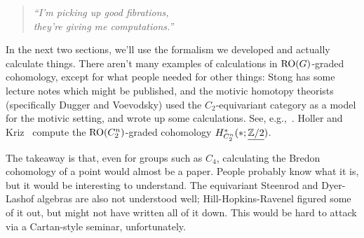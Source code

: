 \begin{quote}\textit{
	``I'm picking up good fibrations,\\
	they're giving me computations.''
}\end{quote}
\label{const_comp}

In the next two sections, we'll use the formalism we developed and actually calculate things. There aren't many
examples of calculations in $\mathrm{RO}(G)$-graded cohomology, except for what people needed for other things: Stong has
some lecture notes which might be published, and the motivic homotopy theorists (specifically Dugger and Voevodsky)
used the $C_2$-equivariant category as a model for the motivic setting, and wrote up some calculations. See,
e.g.,~\cite{Lew88, Dug15}. Holler and Kriz~\cite{HollerKriz} compute the $\mathrm{RO}(C_2^n)$-graded cohomology
$H_{C_2^n}^*(*; \underline{\mathbb Z/2})$.

The takeaway is that, even for groups such as $C_4$, calculating the Bredon cohomology of a point would almost be a
paper. People probably know what it is, but it would be interesting to understand. The equivariant Steenrod and
Dyer-Lashof algebras are also not understood well; Hill-Hopkins-Ravenel figured some of it out, but might not have
written all of it down. This would be hard to attack via a Cartan-style seminar, unfortunately.

